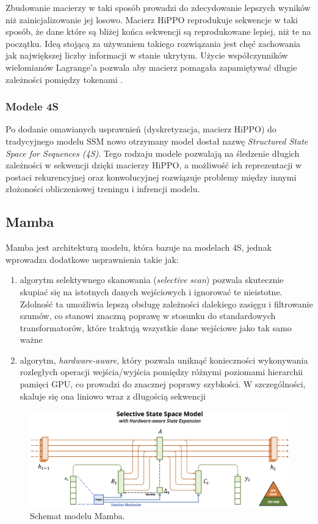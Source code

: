 \documentclass[data-science]{agh-wi} %
\begin{document}
Zbudowanie macierzy w taki sposób prowadzi do zdecydowanie lepszych wyników niż zainicjalizowanie jej losowo. Macierz HiPPO reprodukuje sekwencje w taki sposób, że dane które są bliżej końca sekwencji są reprodukowane lepiej, niż te na początku. Ideą stojącą za używaniem takiego rozwiązania jest chęć zachowania jak największej liczby informacji w stanie ukrytym. Użycie współczynników wielomianów Lagrange'a pozwala aby macierz pomagała zapamiętywać długie zależności pomiędzy tokenami \cite{lagrange}.

\subsubsection*{Modele 4S}
Po dodanie omawianych usprawnień (dyskretyzacja, macierz HiPPO) do tradycyjnego modelu SSM nowo otrzymany model dostał nazwę \textit{Structured State Space for Sequences (4S)}. Tego rodzaju modele pozwalają na śledzenie długich zależności w sekwencji dzięki macierzy HiPPO, a możliwość ich reprezentacji w postaci rekurencyjnej oraz konwolucyjnej rozwiązuje problemy między innymi złożoności obliczeniowej treningu i infrencji modelu.

\subsection{Mamba}
Mamba \cite{mamba} jest architekturą modelu, która bazuje na modelach 4S, jednak wprowadza dodatkowe usprawnienia takie jak:
\begin{enumerate}
    \item algorytm selektywnego skanowania (\textit{selective scan}) pozwala skutecznie skupiać się na istotnych danych wejściowych i ignorować te nieistotne. Zdolność ta umożliwia lepszą obsługę zależności dalekiego zasięgu i filtrowanie szumów, co stanowi znaczną poprawę w stosunku do standardowych transformatorów, które traktują wszystkie dane wejściowe jako tak samo ważne
    \item algorytm, \textit{hardware-aware}, który pozwala uniknąć konieczności wykonywania rozległych operacji wejścia/wyjścia pomiędzy różnymi poziomami hierarchii pamięci GPU, co prowadzi do znacznej poprawy szybkości. W szczególności, skaluje się ona liniowo wraz z długością sekwencji
\end{enumerate}

\begin{figure}[ht!]
    \begin{center}
        \includegraphics[width=0.9\linewidth]{img/mamba1.png}
    \end{center}
    \caption{Schemat modelu Mamba.}
    \label{fig:mamba1}
\end{figure}
\end{document}
